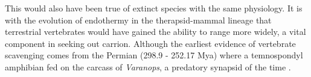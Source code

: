 \documentclass[a4paper,12pt]{article}
\begin{document}
This would also have been true of extinct species with the same physiology. 
It is with the evolution of endothermy in the therapsid-mammal lineage \citep{clarke2010temperature} that terrestrial vertebrates would have gained the ability to range more widely, a vital component in seeking out carrion. 
Although the earliest evidence of vertebrate scavenging comes from the Permian (298.9 - 252.17 Mya) where a temnospondyl amphibian fed on the carcass of \textit{Varanops}, a predatory synapsid of the time \citep{reisz2006articulated}. 
\end{document}
